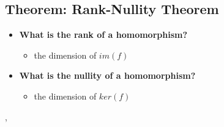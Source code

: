 \documentclass{exam}
\begin{document}
\subsection{Theorem: Rank-Nullity Theorem}

\begin{itemize}
    \item \textbf{What is the rank of a homomorphism?}
    \begin{itemize}
        \item the dimension of $im(f)$
    \end{itemize}
    \item \textbf{What is the nullity of a homomorphism?}
    \begin{itemize}
        \item the dimension of $ker(f)$
    \end{itemize}
\end{itemize}

\sep 

\end{document}
